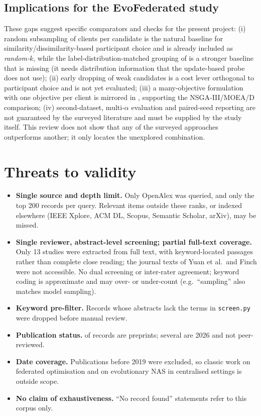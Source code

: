 \documentclass[11pt,a4paper]{article}
\begin{document}
\subsection*{Implications for the EvoFederated study}
These gaps suggest specific comparators and checks for the present project: (i) random subsampling of clients per candidate \cite{zhu2021realtime} is the natural baseline for similarity/dissimilarity-based participant choice and is already included as \emph{random-$k$}, while the label-distribution-matched grouping of \cite{yuan2022resourceaware} is a stronger baseline that is missing (it needs distribution information that the update-based probe does not use); (ii) early dropping of weak candidates \cite{yuan2022resourceaware} is a cost lever orthogonal to participant choice and is not yet evaluated; (iii) a many-objective formulation with one objective per client is mirrored in \cite{zhong2022optimizing}, supporting the NSGA-III/MOEA/D comparison; (iv) second-dataset, multi-$\alpha$ evaluation and paired-seed reporting are not guaranteed by the surveyed literature and must be supplied by the study itself. This review does not show that any of the surveyed approaches outperforms another; it only locates the unexplored combination.

\section{Threats to validity}\label{sec:threats}
\begin{itemize}
\item \textbf{Single source and depth limit.} Only OpenAlex was queried, and only the top 200 records per query. Relevant items outside these ranks, or indexed elsewhere (IEEE Xplore, ACM DL, Scopus, Semantic Scholar, arXiv), may be missed.
\item \textbf{Single reviewer, abstract-level screening; partial full-text coverage.} Only 13 studies were extracted from full text, with keyword-located passages rather than complete close reading; the journal texts of Yuan et al.\ and Finch were not accessible. No dual screening or inter-rater agreement; keyword coding is approximate and may over- or under-count (e.g.\ ``sampling'' also matches model sampling).
\item \textbf{Keyword pre-filter.} Records whose abstracts lack the terms in \texttt{screen.py} were dropped before manual review.
\item \textbf{Publication status.} \npre{} of \nN{} records are preprints; several are 2026 and not peer-reviewed.
\item \textbf{Date coverage.} Publications before 2019 were excluded, so classic work on federated optimisation and on evolutionary NAS in centralised settings is outside scope.
\item \textbf{No claim of exhaustiveness.} ``No record found'' statements refer to this corpus only.
\end{itemize}
\end{document}
